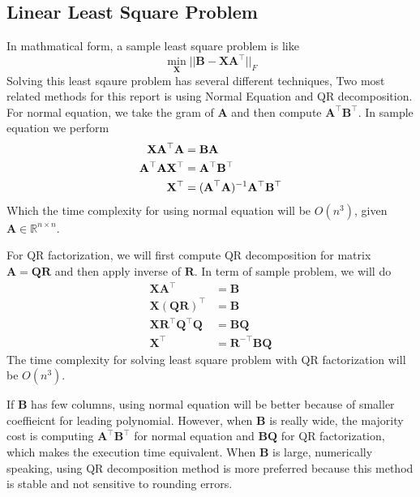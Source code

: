 \documentclass{article}
\newcommand{\mat}[1]{\mathbf{#1}}
\newcommand{\M}[2][]{\bm{#1{\mathbf{\MakeUppercase{#2}}}}} 		%
\begin{document}
\subsection*{Linear Least Square Problem}
In mathmatical form, a sample least square problem is like 
$$\min_{\mat{X}}||\mat{B} - \mat{X}\mat{A}^\top||_{F}$$
Solving this least sqaure problem has several different techniques, Two most related methods for this report
is using Normal Equation and QR decomposition.
For normal equation, we take the gram of $\mat{A}$ and then compute $\mat{A}^\top\mat{B}^\top$. In sample equation we perform
\begin{align}
\mat{X}\mat{A}^\top\mat{A} &= \mat{B}\mat{A} \nonumber \\
\mat{A}^\top\mat{A}\mat{X}^\top &= \mat{A}^\top\mat{B}^\top \nonumber \\
\mat{X}^\top &= (\M{A}^\top\mat{A})^{-1}\mat{A}^\top\mat{B}^\top \nonumber
\end{align}
Which the time complexity for using normal equation will be $O(n^3)$, given $\mat{A} \in \mathbb{R}^{n \times n}$.

For QR factorization, we will first compute QR decomposition for matrix $\mat{A} = \mat{Q}\mat{R}$ and then apply inverse of $\mat{R}$. In term
of sample problem, we will do
\begin{align}
  \mat{X}\mat{A}^\top &= \mat{B} \nonumber \\
  \mat{X}(\mat{Q}\mat{R})^\top &= \mat{B} \nonumber \\
  \mat{X}\mat{R}^\top\mat{Q}^\top\mat{Q} &= \mat{B}\mat{Q} \nonumber \\
  \mat{X}^\top &= \mat{R}^{-\top}\mat{B}\mat{Q} \nonumber
\end{align} 
The time complexity for solving least square problem with QR factorization will be $O(n^3)$.


If $\mat{B}$ has few columns, using normal equation will be better because of smaller coeffieicnt
for leading polynomial. However, when $\mat{B}$ is really wide, the majority cost 
is computing $\mat{A}^\top\mat{B}^\top$ for normal equation and $\mat{B}\mat{Q}$ for QR factorization, 
which makes the execution time equivalent.
When $\mat{B}$ is large, numerically speaking, using QR decomposition method is more preferred because this method is stable
and not sensitive to rounding errors.
\end{document}
